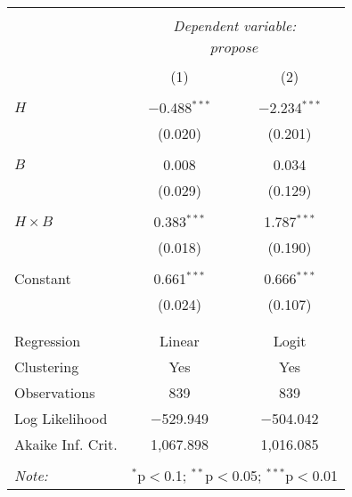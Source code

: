 
\begin{tabular}{@{\extracolsep{5pt}}lcc} 
\\[-1.8ex]\hline 
\hline \\[-1.8ex] 
 & \multicolumn{2}{c}{\textit{Dependent variable:}} \\ 
\cline{2-3} 
\\[-1.8ex] & \multicolumn{2}{c}{$propose$} \\ 
\\[-1.8ex] & (1) & (2)\\ 
\hline \\[-1.8ex] 
 $H$ & $-$0.488$^{***}$ & $-$2.234$^{***}$ \\ 
  & (0.020) & (0.201) \\ 
  & & \\ 
 $B$ & 0.008 & 0.034 \\ 
  & (0.029) & (0.129) \\ 
  & & \\ 
 $H\times B$ & 0.383$^{***}$ & 1.787$^{***}$ \\ 
  & (0.018) & (0.190) \\ 
  & & \\ 
 Constant & 0.661$^{***}$ & 0.666$^{***}$ \\ 
  & (0.024) & (0.107) \\ 
  & & \\ 
\hline \\[-1.8ex] 
Regression & Linear & Logit \\ 
Clustering & Yes & Yes \\ 
Observations & 839 & 839 \\ 
Log Likelihood & $-$529.949 & $-$504.042 \\ 
Akaike Inf. Crit. & 1,067.898 & 1,016.085 \\ 
\hline 
\hline \\[-1.8ex] 
\textit{Note:}  & \multicolumn{2}{r}{$^{*}$p$<$0.1; $^{**}$p$<$0.05; $^{***}$p$<$0.01} \\ 
\end{tabular} 
